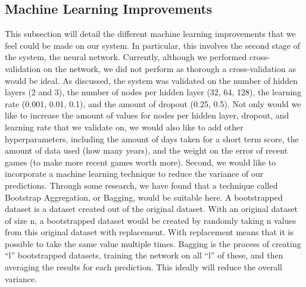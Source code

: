 \subsection{Machine Learning Improvements}
This subsection will detail the different machine learning improvements that we feel could be made on our system. In particular, this involves the second stage of the system, the neural network. Currently, although we performed cross-validation on the network, we did not perform as thorough a cross-validation as would be ideal. As discussed, the system was validated on the number of hidden layers (2 and 3), the number of nodes per hidden layer (32, 64, 128), the learning rate (0.001, 0.01, 0.1), and the amount of dropout (0.25, 0.5). Not only would we like to increase the amount of values for nodes per hidden layer, dropout, and learning rate that we validate on, we would also like to add other hyperparameters, including the amount of days taken for a short term score, the amount of data used (how many years), and the weight on the error of recent games (to make more recent games worth more).
Second, we would like to incorporate a machine learning technique to reduce the variance of our predictions. Through some research, we have found that a technique called Bootstrap Aggregation, or Bagging, would be suitable here. A bootstrapped dataset is a dataset created out of the original dataset. With an original dataset of size n, a bootstrapped dataset would be created by randomly taking n values from this original dataset with replacement. With replacement means that it is possible to take the same value multiple times. Bagging is the process of creating ``l'' bootstrapped datasets, training the network on all ``l'' of these, and then averaging the results for each prediction. This ideally will reduce the overall variance. 
